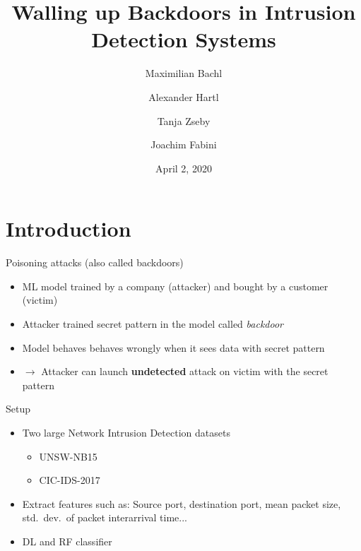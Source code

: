 \documentclass[xcolor={dvipsnames}]{beamer}
\title{Walling up Backdoors in Intrusion Detection Systems}
\author[Maximilian Bachl]{%
	Maximilian Bachl\email{maximilian.bachl@tuwien.ac.at} \and Alexander Hartl\email{alexander.hartl@tuwien.ac.at} \and Tanja Zseby\email{tanja.zseby@tuwien.ac.at} \and Joachim Fabini\email{joachim.fabini@tuwien.ac.at}
}
\institute{%
	Technische Universität Wien, Vienna, Austria
}
\date[April 2, 2020]{April 2, 2020}
\begin{document}
\maketitle

\section{Introduction}

\begin{frame}{Poisoning attacks (also called backdoors)}
\begin{itemize}
\item ML model trained by a company (attacker) and bought by a customer (victim)
\item Attacker trained secret pattern in the model called \textit{backdoor}
\item Model behaves behaves wrongly when it sees data with secret pattern
\item $\rightarrow$ Attacker can launch \textbf{undetected} attack on victim with the secret pattern 
\end{itemize}
\end{frame}


\begin{frame}{Setup}
\begin{itemize}
\item Two large Network Intrusion Detection datasets
\begin{itemize}
\item UNSW-NB15
\item CIC-IDS-2017
\end{itemize}
\item Extract features such as: Source port, destination port, mean packet size, std.~dev.~of packet interarrival time...
\item DL and RF classifier
\end{itemize}
\end{frame}
\end{document}
